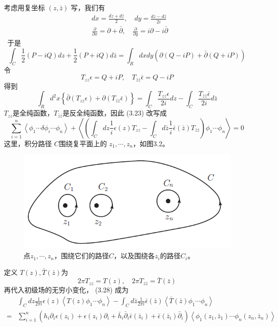 考虑用复坐标 $(z,\bar{z})$ 写，我们有
\begin{equation}
\begin{aligned} &d x=\frac{d z+d \bar{z}}{2}, \quad d y=\frac{d z-d \bar{z}}{2 i}\\ &\frac{\partial}{\partial x}=\partial+\bar{\partial}, \quad \frac{\partial}{\partial y}=i \partial-i \bar{\partial} \end{aligned}
\end{equation}\
于是
\begin{equation}
	\int_{C} \frac{1}{2}(P-i Q) d z+\frac{1}{2}(P+i Q) d \bar{z}=\int_{R} d x d y(\partial(Q-i P)+\bar{\partial}(Q+i P))
\end{equation}
令
\[
T_{z z} \epsilon=Q+i P, \quad T_{\bar{z} \bar{z}} \bar{\epsilon}=Q-i P\]
得到
\begin{equation}
	\int_{R} d^{2} x\left\{\bar{\partial}\left(T_{z z} \epsilon\right)+\partial\left(T_{\bar{z} \bar{z}} \bar{\epsilon}\right)\right\}=\int_{C} \frac{T_{z z} \epsilon}{2 i} d z-\int_{C} \frac{T_{\bar{z} \bar{z}} \bar{\epsilon}}{2 i} d \bar{z}
\end{equation}
$T_{zz} $是全纯函数，$ T_{\bar{z} \bar{z}} $是反全纯函数，因此 (3.23) 改写成
\begin{equation}
\sum_{i=1}^{n}\left\langle\phi_{1} \cdots \delta \phi_{i} \cdots \phi_{n}\right\rangle+\left\langle\left(\int_{C} d z \frac{1}{i} \epsilon(z) T_{z z}-\int_{C} d \bar{z} \frac{1}{i} \bar{\epsilon}(\bar{z}) T_{\bar{z} \bar{z}}\right) \phi_{1} \cdots \phi_{n}\right\rangle=0 
\end{equation}
这里，积分路径 $C $围绕复平面上的 $z_1,\cdots,z_n $，如图3.2。
\begin{figure}[h]
	\centering
	\includegraphics[width=0.6\linewidth]{fig/3.2.png}
	\caption{ 点$z_1,\cdots,z_n$，围绕它们的路径$C$，以及围绕各$z_i$的路径$C_i$。}
\end{figure}

定义 $T(z),\bar{T}(\bar{z}) $为
\[
2 \pi T_{z z}=T(z), \quad 2 \pi T_{\bar{z} \bar{z}}=\bar{T}(\bar{z})
\]
再代入初级场的无穷小变化， (3.28) 成为
\begin{equation}
\begin{aligned} &\int_{C} d z \frac{1}{2 \pi i} \epsilon(z)\left\langle T(z) \phi_{1} \cdots \phi_{n}\right\rangle-\int_{C} d \bar{z} \frac{1}{2 \pi i} \bar{\epsilon}(\bar{z})\left\langle\bar{T}(\bar{z}) \phi_{1} \cdots \phi_{n}\right\rangle\\ =&\sum_{i=1}^{n}\left(h_{i} \partial_{i} \epsilon\left(z_{i}\right)+\epsilon\left(z_{i}\right) \partial_{i}+\bar{h}_{i} \bar{\partial}_{i} \bar{\epsilon}\left(\bar{z}_{i}\right)+\bar{\epsilon}\left(\bar{z}_{i}\right) \bar{\partial}_{i}\right)\left\langle\phi_{1}\left(z_{1}, \bar{z}_{1}\right) \cdots \phi_{n}\left(z_{n}, \bar{z}_{n}\right)\right\rangle \end{aligned}
\end{equation}

